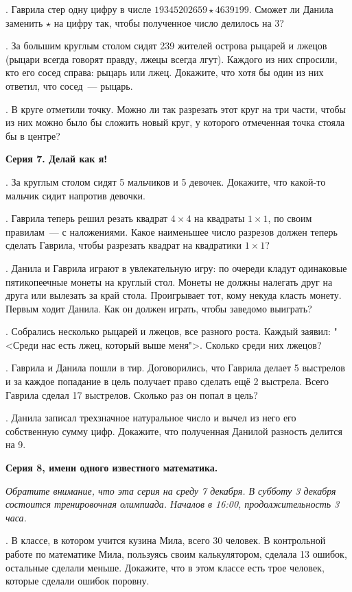 . Гаврила стер одну цифру в числе $19345202659\star 4639199$. 
Сможет ли Данила заменить $\star$ на цифру так, чтобы полученное число делилось на 3?

. За большим круглым столом сидят 239 жителей острова рыцарей и лжецов
(рыцари всегда говорят правду, лжецы всегда лгут). Каждого из них спросили,
кто его сосед справа: рыцарь или лжец. Докажите, что хотя бы один из них
ответил, что сосед~--- рыцарь.

. В круге отметили точку. Можно ли так разрезать этот круг
на три части, чтобы из них можно было бы сложить новый круг, 
у которого отмеченная точка стояла бы в центре?

\centerline{\bf Серия 7. Делай как я!}

. За круглым столом сидят 5 мальчиков и 5 девочек. Докажите,
что какой-то мальчик сидит напротив девочки.

. Гаврила теперь решил резать квадрат $4\times 4$ на квадраты $1\times 1$, 
по своим правилам~--- с наложениями. 
Какое наименьшее число разрезов должен теперь сделать
Гаврила, чтобы разрезать квадрат на квадратики $1\times 1$?

.  Данила и Гаврила играют в увлекательную игру: по очереди кладут одинаковые
пятикопеечные монеты на круглый  стол. Монеты не должны  налегать друг на
друга или вылезать за край стола.  Проигрывает тот, кому некуда класть
монету. Первым ходит Данила. Как он  должен играть, чтобы заведомо выиграть?

.  Собрались несколько рыцарей и лжецов, все разного роста.
Каждый заявил:  "<Среди нас есть лжец, который выше меня">.
Сколько среди них лжецов?

. Гаврила и Данила пошли в тир. Договорились, 
что Гаврила делает 5 выстрелов и за каждое попадание в цель 
получает право сделать ещё 2 выстрела. 
Всего Гаврила сделал 17 выстрелов. Сколько раз он попал
в цель?

. Данила записал трехзначное 
натуральное число и вычел из него его собственную сумму цифр.
Докажите, что полученная Данилой разность делится на 9.

\centerline{\bf Серия 8, имени одного известного математика. }

\small
\textit{Обратите внимание, что эта серия на среду 7 декабря. 
В субботу 3 декабря состоится тренировочная олимпиада.
Началов в 16:00, продолжительность 3 часа.}
\normalsize

.  В классе, в котором учится кузина Мила, всего 30 человек. В контрольной
работе по математике Мила, пользуясь своим калькулятором, сделала 13 ошибок, остальные сделали меньше.
Докажите, что в этом классе есть трое человек, которые сделали ошибок поровну.

